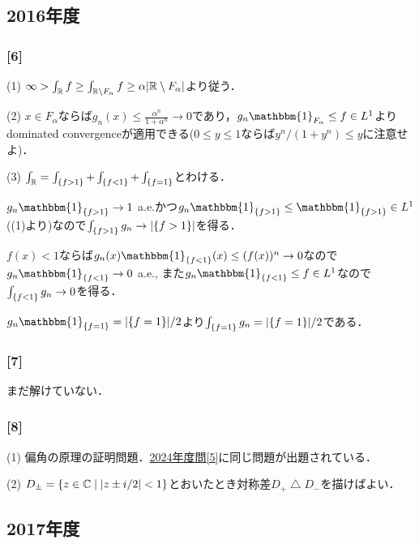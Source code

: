 \documentclass[a4j]{ltjsarticle}
\newcommand{\Rset}{\mathbb{R}}
\newcommand{\Cset}{\mathbb{C}}
\newcommand{\1}{\mathbbm{1}}
\numberwithin{equation}{section}
\theoremstyle{definition}
\begin{document}
\subsection{2016年度}
\subsubsection*{[6]}
(1) $\infty>\int_{\Rset}f\geq \int_{\Rset\setminus F_\alpha}f\geq \alpha\abs{\Rset\setminus F_{\alpha}}$より従う．

(2) $x\in F_{\alpha}$ならば$g_n(x)\leq \frac{\alpha^n}{1+\alpha^n}\to 0$であり，$g_n\1_{F_{\alpha}}\leq f\in L^1$よりdominated convergenceが適用できる($0\leq y\leq 1$ならば$y^n/(1+y^n)\leq y$に注意せよ)．

(3) $\int_{\Rset}=\int_{\qty{f>1}}+\int_{\qty{f<1}}+\int_{\qty{f=1}}$とわける．

$g_n\1_{\qty{f>1}}\to 1$ a.e.かつ$g_n\1_{\qty{f>1}}\leq \1_{\qty{f>1}}\in L^1$ ((1)より)なので$\int_{\qty{f>1}}g_n\to \abs{\qty{f>1}}$を得る．

$f(x)<1$ならば$g_n(x)\1_{\qty{f<1}}(x)\leq (f(x))^n\to0$なので$g_n\1_{\qty{f<1}}\to0$ a.e., また$g_n\1_{\qty{f<1}}\leq f\in L^1$なので$\int_{\qty{f<1}}g_n\to0$を得る．

$g_n\1_{\qty{f=1}}=\abs{\qty{f=1}}/2$より$\int_{\qty{f=1}}g_n=\abs{\qty{f=1}}/2$である．

\subsubsection*{[7]}
{\color{red} まだ解けていない．}

\subsubsection*{[8]}
(1) 偏角の原理の証明問題．\hyperref[2024_pm_5]{2024年度問[5]}に同じ問題が出題されている．

(2) $D_{\pm}=\qty{z\in\Cset\mid \abs{z\pm i/2}<1}$とおいたとき対称差$D_{+}\bigtriangleup D_{-}$を描けばよい．
\subsection{2017年度}
\end{document}
